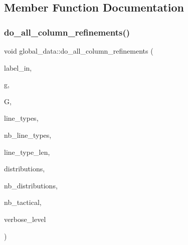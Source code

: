 \subsection{Member Function Documentation}
\mbox{\label{classglobal__data_a0ee86ce10416cfcf668c2461a2beb394}} 
\subsubsection{\texorpdfstring{do\+\_\+all\+\_\+column\+\_\+refinements()}{do\_all\_column\_refinements()}}
{\footnotesize\ttfamily void global\+\_\+data\+::do\+\_\+all\+\_\+column\+\_\+refinements (\begin{DoxyParamCaption}\item[{\mbox{\hyperlink{galois_8h_ab6cc7b4aeb6ea31aba2b3fbfc83ff5e6}{B\+Y\+TE}} $\ast$}]{label\+\_\+in,  }\item[{ofstream \&}]{g,  }\item[{\mbox{\hyperlink{classtdo__scheme}{tdo\+\_\+scheme}} \&}]{G,  }\item[{\mbox{\hyperlink{galois_8h_a09fddde158a3a20bd2dcadb609de11dc}{I\+NT}} $\ast$}]{line\+\_\+types,  }\item[{\mbox{\hyperlink{galois_8h_a09fddde158a3a20bd2dcadb609de11dc}{I\+NT}}}]{nb\+\_\+line\+\_\+types,  }\item[{\mbox{\hyperlink{galois_8h_a09fddde158a3a20bd2dcadb609de11dc}{I\+NT}}}]{line\+\_\+type\+\_\+len,  }\item[{\mbox{\hyperlink{galois_8h_a09fddde158a3a20bd2dcadb609de11dc}{I\+NT}} $\ast$}]{distributions,  }\item[{\mbox{\hyperlink{galois_8h_a09fddde158a3a20bd2dcadb609de11dc}{I\+NT}}}]{nb\+\_\+distributions,  }\item[{\mbox{\hyperlink{galois_8h_a09fddde158a3a20bd2dcadb609de11dc}{I\+NT}} \&}]{nb\+\_\+tactical,  }\item[{\mbox{\hyperlink{galois_8h_a09fddde158a3a20bd2dcadb609de11dc}{I\+NT}}}]{verbose\+\_\+level }\end{DoxyParamCaption})}

\mbox{\label{classglobal__data_ad9fc379d1c496c7ceea899c2132a62c1}} 
